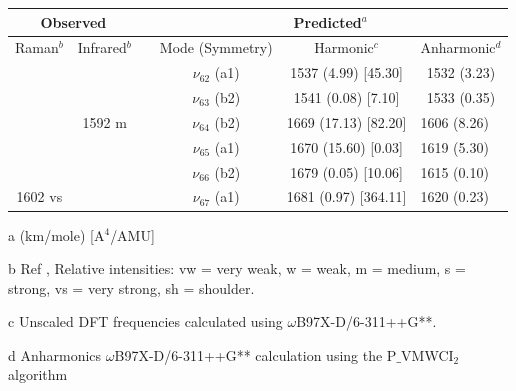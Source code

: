   
 
  \begin{table}[H]
   	\begin{center}
  		\begin{threeparttable}
  			\begin{tabular}{c c c c c c}
  				\hline
  				\multicolumn{ 2}{c}{Observed} & \multicolumn{1}{c}{} & \multicolumn{ 3}{c}{Predicted$^{a}$} \\ \hline
  				Raman$^{b}$ & \multicolumn{1}{c}{Infrared$^{b}$} &  & \multicolumn{1}{c}{Mode (Symmetry)} & \multicolumn{1}{c}{Harmonic$^{c}$} & Anharmonic$^{d}$ \\ \hline 
 &  & \multicolumn{1}{l}{} & $\nu_{62}$ (a1) & 1537 (4.99) [45.30] & 1532 (3.23) \\ 
 &  & \multicolumn{1}{l}{} &  $\nu_{63}$ (b2) & 1541 (0.08) [7.10] & 1533 (0.35) \\ 
 &  1592 m & \multicolumn{1}{l}{} &  $\nu_{64}$ (b2) & 1669 (17.13) [82.20] & \multicolumn{1}{l}{1606 (8.26)} \\ 
 &  & \multicolumn{1}{l}{} &    $\nu_{65}$ (a1) & 1670 (15.60) [0.03] & \multicolumn{1}{l}{1619 (5.30)} \\ 
 &  & \multicolumn{1}{l}{} &$\nu_{66}$ (b2) & 1679 (0.05) [10.06] & \multicolumn{1}{l}{1615 (0.10)} \\ 
 1602 vs &  & \multicolumn{1}{l}{} & $\nu_{67}$ (a1) & 1681 (0.97) [364.11] & \multicolumn{1}{l}{1620 (0.23)} \\ 
\bottomrule
\end{tabular}

\begin{tablenotes}
	\item[a] (km/mole) [A$^{4}$/AMU]
	\item[b] Ref \cite{michaelian2014raman}, Relative intensities: vw = very weak, w = weak, m = medium, s = strong, vs = very strong, sh = shoulder.
	\item[c] Unscaled DFT frequencies calculated using $\omega$B97X-D/6-311++G**.
	\item[d] Anharmonics $\omega$B97X-D/6-311++G** calculation using the P$\_$VMWCI$_{2}$ algorithm
\end{tablenotes}
\end{threeparttable}
\end{center}
\label{freq-18-dimethylfluorene}
\end{table}


